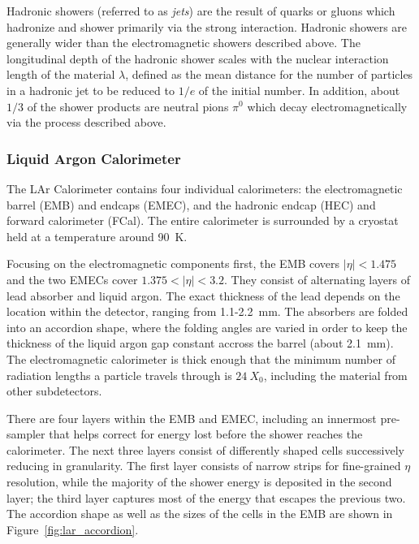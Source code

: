 Hadronic showers (referred to as \emph{jets}) are the result of quarks or gluons which hadronize and shower primarily via the strong interaction.
Hadronic showers are generally wider than the electromagnetic showers described above.
The longitudinal depth of the hadronic shower scales with the nuclear interaction length of the material $\lambda$, defined as the mean distance for the number of particles in a hadronic jet to be reduced to $1/e$ of the initial number.
In addition, about $1/3$ of the shower products are neutral pions $\pi^0$ which decay electromagnetically via the process described above.


\subsubsection{Liquid Argon Calorimeter} \label{sec:lar}
The LAr Calorimeter contains four individual calorimeters: the electromagnetic barrel (EMB) and endcaps (EMEC), and the hadronic endcap (HEC) and forward calorimeter (FCal).
The entire calorimeter is surrounded by a cryostat held at a temperature around 90~K.

Focusing on the electromagnetic components first, the EMB covers $|\eta| < 1.475$ and the two EMECs cover $1.375 < |\eta| < 3.2$.
They consist of alternating layers of lead absorber and liquid argon.
The exact thickness of the lead depends on the location within the detector, ranging from 1.1-2.2~mm.
The absorbers are folded into an accordion shape, where the folding angles are varied in order to keep the thickness of the liquid argon gap constant accross the barrel (about 2.1~mm).
The electromagnetic calorimeter is thick enough that the minimum number of radiation lengths a particle travels through is $24~X_0$, including the material from other subdetectors.

There are four layers within the EMB and EMEC, including an innermost pre-sampler that helps correct for energy lost before the shower reaches the calorimeter.
The next three layers consist of differently shaped cells successively reducing in granularity.
The first layer consists of narrow strips for fine-grained $\eta$ resolution, while the majority of the shower energy is deposited in the second layer; the third layer captures most of the energy that escapes the previous two.
The accordion shape as well as the sizes of the cells in the EMB are shown in Figure~\ref{fig:lar_accordion}.

